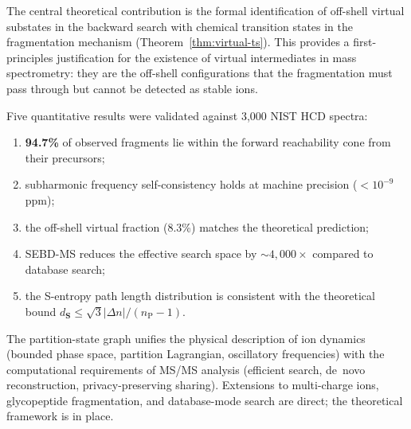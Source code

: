 \documentclass[twocolumn,10pt,a4paper]{article}
\theoremstyle{thmstyle}
\theoremstyle{definition}
\theoremstyle{remark}
\newcommand{\Sv}{\mathbf{S}}
\newcommand{\nP}{n_{\mathrm{P}}}
\begin{document}
The central theoretical contribution is the formal identification of
off-shell virtual substates in the backward search with chemical
transition states in the fragmentation mechanism
(Theorem~\ref{thm:virtual-ts}). This provides a first-principles
justification for the existence of virtual intermediates in mass
spectrometry: they are the off-shell configurations that the
fragmentation must pass through but cannot be detected as stable ions.

Five quantitative results were validated against 3{,}000 NIST HCD
spectra:
\begin{enumerate}[nosep,label=(\roman*)]
\item \textbf{94.7\%} of observed fragments lie within the forward
  reachability cone from their precursors;
\item subharmonic frequency self-consistency holds at machine precision
  ($<10^{-9}$\,ppm);
\item the off-shell virtual fraction (8.3\%) matches the theoretical
  prediction;
\item SEBD-MS reduces the effective search space by $\sim 4{,}000\times$
  compared to database search;
\item the S-entropy path length distribution is consistent with the
  theoretical bound $d_{\Sv} \leq \sqrt{3}|\Delta n|/(\nP - 1)$.
\end{enumerate}

The partition-state graph unifies the physical description of ion
dynamics (bounded phase space, partition Lagrangian, oscillatory
frequencies) with the computational requirements of MS/MS analysis
(efficient search, de~novo reconstruction, privacy-preserving sharing).
Extensions to multi-charge ions, glycopeptide fragmentation, and
database-mode search are direct; the theoretical framework is in place.



\end{document}
